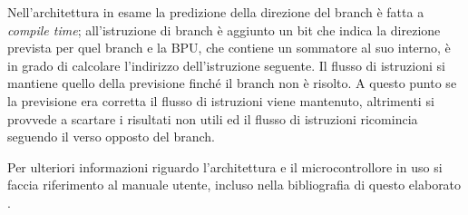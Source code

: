 Nell'architettura in esame la predizione della direzione del branch è fatta a \textit{compile time}; all'istruzione di branch è aggiunto un bit che indica la direzione prevista per quel branch e la BPU, che contiene un sommatore al suo interno, è in grado di calcolare l'indirizzo dell'istruzione seguente. Il flusso di istruzioni si mantiene quello della previsione finché il branch non è risolto. A questo punto se la previsione era corretta il flusso di istruzioni viene mantenuto, altrimenti si provvede a scartare i risultati non utili ed il flusso di istruzioni ricomincia seguendo il verso opposto del branch.

Per ulteriori informazioni riguardo l'architettura e il microcontrollore in uso si faccia riferimento al manuale utente, incluso nella bibliografia di questo elaborato \cite{e300manual}.










